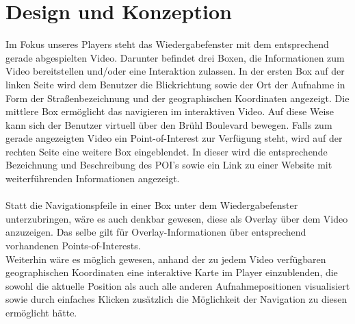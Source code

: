 \chapter{Design und Konzeption}
Im Fokus unseres Players steht das Wiedergabefenster mit dem entsprechend gerade abgespielten Video. Darunter befindet drei Boxen, die Informationen zum Video bereitstellen und/oder eine Interaktion zulassen. In der ersten Box auf der linken Seite wird dem Benutzer die Blickrichtung sowie der Ort der Aufnahme in Form der Straßenbezeichnung und der geographischen Koordinaten angezeigt. Die mittlere Box ermöglicht das navigieren im interaktiven Video. Auf diese Weise kann sich der Benutzer virtuell über den Brühl Boulevard bewegen. Falls zum gerade angezeigten Video ein Point-of-Interest zur Verfügung steht, wird auf der rechten Seite eine weitere Box eingeblendet. In dieser wird die entsprechende Bezeichnung und Beschreibung des POI's sowie ein Link zu einer Website mit weiterführenden Informationen angezeigt.\\ \\
Statt die Navigationspfeile in einer Box unter dem Wiedergabefenster unterzubringen, wäre es auch denkbar gewesen, diese als Overlay über dem Video anzuzeigen. Das selbe gilt für Overlay-Informationen über entsprechend vorhandenen Points-of-Interests. \\
Weiterhin wäre es möglich gewesen, anhand der zu jedem Video verfügbaren geographischen Koordinaten eine interaktive Karte im Player einzublenden, die sowohl die aktuelle Position als auch alle anderen Aufnahmepositionen visualisiert sowie durch einfaches Klicken zusätzlich die Möglichkeit der Navigation zu diesen ermöglicht hätte.



